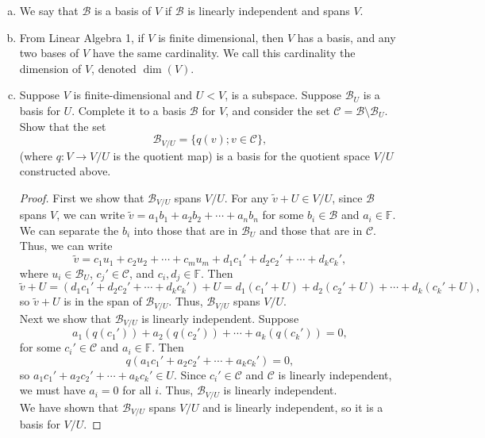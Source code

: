 \documentclass{article}
\begin{document}
\begin{enumerate}[a)]
   \item We say that $\mathscr{B}$ is a basis of $V$ if $\mathscr{B}$ is linearly independent and spans $V$.
   \item From Linear Algebra 1, if $V$ is finite dimensional, then $V$ has a basis, and any two bases of $V$ have the same cardinality. We call this cardinality the dimension of $V$, denoted $\dim(V)$.
   \item Suppose $V$ is finite-dimensional and $U < V$, is a subspace. Suppose $\mathscr{B}_U$ is a basis for $U$. Complete it to a basis $\mathscr{B}$ for $V$, and consider the set $\mathscr{C} = \mathscr{B} \setminus \mathscr{B}_U$. Show that the set
   \[
     \mathscr{B}_{V/U} = \{q(v) ; v \in \mathscr{C}\},
   \]
   (where $q: V \to V/U$ is the quotient map) is a basis for the quotient space $V/U$ constructed above. \\
   \begin{proof}
      First we show that $\mathscr{B}_{V/U}$ spans $V/U$. For any $\tilde{v} + U \in V/U$, since $\mathscr{B}$ spans $V$, we can write $\tilde{v} = a_1b_1 + a_2b_2 + \cdots + a_nb_n$ for some $b_i \in \mathscr{B}$ and $a_i \in \mathbb{F}$. We can separate the $b_i$ into those that are in $\mathscr{B}_U$ and those that are in $\mathscr{C}$. Thus, we can write
      \[
         \tilde{v} = c_1u_1 + c_2u_2 + \cdots + c_mu_m + d_1c_1' + d_2c_2' + \cdots + d_kc_k',
      \]
      where $u_i \in \mathscr{B}_U$, $c_j' \in \mathscr{C}$, and $c_i, d_j \in \mathbb{F}$. Then 
      \[
         \tilde{v} + U = (d_1c_1' + d_2c_2' + \cdots + d_kc_k') + U = d_1(c_1' + U) + d_2(c_2' + U) + \cdots + d_k(c_k' + U),
      \]
      so $\tilde{v} + U$ is in the span of $\mathscr{B}_{V/U}$. Thus, $\mathscr{B}_{V/U}$ spans $V/U$. \\ 
      Next we show that $\mathscr{B}_{V/U}$ is linearly independent. Suppose 
      \[
         a_1(q(c_1')) + a_2(q(c_2')) + \cdots + a_k(q(c_k')) = 0,
      \]
      for some $c_i' \in \mathscr{C}$ and $a_i \in \mathbb{F}$. Then 
      \[
         q(a_1c_1' + a_2c_2' + \cdots + a_kc_k') = 0,
      \]
      so $a_1c_1' + a_2c_2' + \cdots + a_kc_k' \in U$. Since $c_i' \in \mathscr{C}$ and $\mathscr{C}$ is linearly independent, we must have $a_i = 0$ for all $i$. Thus, $\mathscr{B}_{V/U}$ is linearly independent. \\ 
      We have shown that $\mathscr{B}_{V/U}$ spans $V/U$ and is linearly independent, so it is a basis for $V/U$.
   \end{proof}
\end{enumerate}
\end{document}
